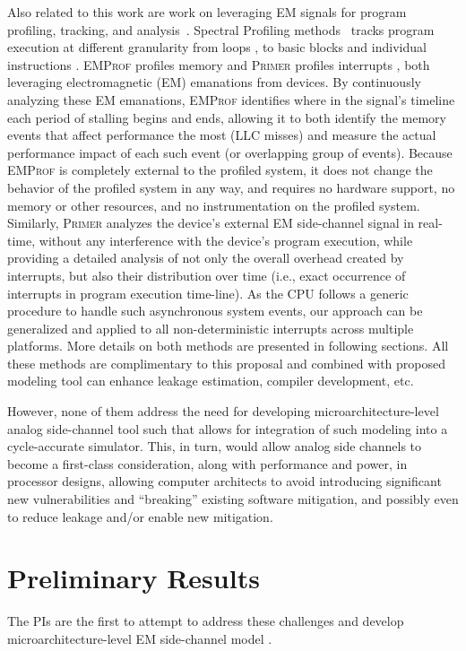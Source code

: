\documentclass[11 pt]{article}
\begin{document}
Also related to this work are work on leveraging EM signals for program profiling, tracking, and analysis~\cite{7783762,Gorman:2017:AON:3123939.3123973,Elvan2021,Zop, Zop2,Moumita2018,Moumita2022}. Spectral Profiling methods~\cite{7783762,Zop,Zop2,Elvan2021} tracks program execution at different granularity from loops \cite{7783762}, to basic blocks \cite{Zop,Zop2} and individual instructions \cite{Elvan2021}. \textsc{EMProf} profiles memory \cite{Moumita2018} and \textsc{Primer} profiles interrupts \cite{Moumita2022}, both leveraging electromagnetic (EM) emanations from devices. By continuously analyzing these EM emanations, \textsc{EMProf} identifies where in the signal's timeline each period of stalling begins and ends, allowing it to both identify the memory events that affect performance the most (LLC misses) and measure the actual performance impact of each such event (or overlapping group of events). Because \textsc{EMProf} is completely external to the profiled system, it does not change the behavior of the profiled system in any way, and requires no hardware support, no memory or other resources, and no instrumentation on the profiled system. Similarly, \textsc{Primer} analyzes the device's external EM side-channel signal in real-time, without any interference with the device's program execution, while providing a detailed analysis of not only the overall overhead created by interrupts, but also their distribution over time (i.e., exact occurrence of interrupts in program execution time-line). As the CPU follows a generic procedure to handle such asynchronous system events, our approach can be generalized and applied to all non-deterministic interrupts across multiple platforms. More details on both methods are presented in following sections. All these methods are complimentary to this proposal and combined with proposed modeling tool can enhance leakage estimation, compiler development, etc.

However, none of them address the need for developing microarchitecture-level analog side-channel tool such that allows for integration of such modeling into a cycle-accurate simulator. This, in turn, would allow analog side channels to become a first-class consideration, along with performance and power, in processor designs, allowing computer architects to avoid introducing significant new vulnerabilities and ``breaking'' existing software mitigation, and possibly even to reduce leakage and/or enable new mitigation.

\section{Preliminary Results}
\label{sec:preliminary_results}
The PIs are the first to attempt to address these challenges and develop microarchitecture-level EM side-channel model \cite{Nader2020}.
\end{document}
